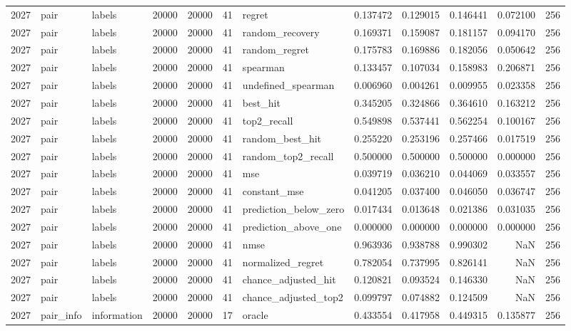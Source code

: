 \begin{tabular}{rllrrrlrrrrr}
2027 & pair & labels & 20000 & 20000 & 41 & regret & 0.137472 & 0.129015 & 0.146441 & 0.072100 & 256 \\
2027 & pair & labels & 20000 & 20000 & 41 & random_recovery & 0.169371 & 0.159087 & 0.181157 & 0.094170 & 256 \\
2027 & pair & labels & 20000 & 20000 & 41 & random_regret & 0.175783 & 0.169886 & 0.182056 & 0.050642 & 256 \\
2027 & pair & labels & 20000 & 20000 & 41 & spearman & 0.133457 & 0.107034 & 0.158983 & 0.206871 & 256 \\
2027 & pair & labels & 20000 & 20000 & 41 & undefined_spearman & 0.006960 & 0.004261 & 0.009955 & 0.023358 & 256 \\
2027 & pair & labels & 20000 & 20000 & 41 & best_hit & 0.345205 & 0.324866 & 0.364610 & 0.163212 & 256 \\
2027 & pair & labels & 20000 & 20000 & 41 & top2_recall & 0.549898 & 0.537441 & 0.562254 & 0.100167 & 256 \\
2027 & pair & labels & 20000 & 20000 & 41 & random_best_hit & 0.255220 & 0.253196 & 0.257466 & 0.017519 & 256 \\
2027 & pair & labels & 20000 & 20000 & 41 & random_top2_recall & 0.500000 & 0.500000 & 0.500000 & 0.000000 & 256 \\
2027 & pair & labels & 20000 & 20000 & 41 & mse & 0.039719 & 0.036210 & 0.044069 & 0.033557 & 256 \\
2027 & pair & labels & 20000 & 20000 & 41 & constant_mse & 0.041205 & 0.037400 & 0.046050 & 0.036747 & 256 \\
2027 & pair & labels & 20000 & 20000 & 41 & prediction_below_zero & 0.017434 & 0.013648 & 0.021386 & 0.031035 & 256 \\
2027 & pair & labels & 20000 & 20000 & 41 & prediction_above_one & 0.000000 & 0.000000 & 0.000000 & 0.000000 & 256 \\
2027 & pair & labels & 20000 & 20000 & 41 & nmse & 0.963936 & 0.938788 & 0.990302 & NaN & 256 \\
2027 & pair & labels & 20000 & 20000 & 41 & normalized_regret & 0.782054 & 0.737995 & 0.826141 & NaN & 256 \\
2027 & pair & labels & 20000 & 20000 & 41 & chance_adjusted_hit & 0.120821 & 0.093524 & 0.146330 & NaN & 256 \\
2027 & pair & labels & 20000 & 20000 & 41 & chance_adjusted_top2 & 0.099797 & 0.074882 & 0.124509 & NaN & 256 \\
2027 & pair_info & information & 20000 & 20000 & 17 & oracle & 0.433554 & 0.417958 & 0.449315 & 0.135877 & 256 \\

\end{tabular}

